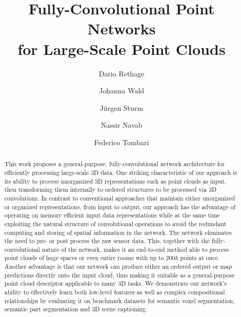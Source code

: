 \documentclass[runningheads]{llncs}
\begin{document}
\title{Fully-Convolutional Point Networks\\for Large-Scale Point Clouds} 


\author{Dario Rethage \and
Johanna Wald \and
J\"urgen Sturm \and \break
Nassir Navab \and
Federico Tombari}


\maketitle              \begin{abstract}
This work proposes a general-purpose, fully-convolutional network architecture for efficiently processing large-scale 3D data. One striking characteristic of our approach is its ability to process unorganized 3D representations such as point clouds as input, then transforming them internally to ordered structures to be processed via 3D convolutions. In contrast to conventional approaches that maintain either unorganized or organized representations, from input to output, our approach has the advantage of operating on memory efficient input data representations while at the same time exploiting the natural structure of convolutional operations to avoid the redundant computing and storing of spatial information in the network. The network eliminates the need to pre- or post process the raw sensor data. This, together with the fully-convolutional nature of the network, makes it an end-to-end method able to process point clouds of huge spaces or even entire rooms with up to $200k$ points at once. Another advantage is that our network can produce either an ordered output or map predictions directly onto the input cloud, thus making it suitable as a general-purpose point cloud descriptor applicable to many 3D tasks. We demonstrate our network's ability to effectively learn both low-level features as well as complex compositional relationships by evaluating it on benchmark datasets for semantic voxel segmentation, semantic part segmentation and 3D scene captioning.

\end{abstract}
\end{document}
